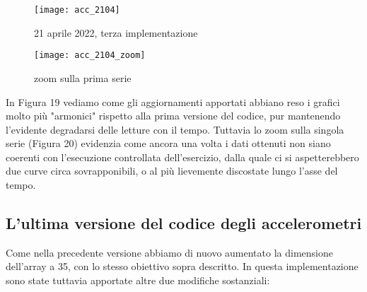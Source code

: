 \documentclass[fleqn,10pt]{SelfArx} %
\begin{document}
\begin{figure}[htb]\centering
	\texttt{[image: acc\_2104]}
	\caption{21 aprile 2022, terza implementazione}
	\label{fig:accelerazione 2104}
\end{figure}

\begin{figure}[htb]\centering
	\texttt{[image: acc\_2104\_zoom]}
	\caption{zoom sulla prima serie}
	\label{fig:zoom accelerazione 2104}
\end{figure}

In Figura 19 vediamo come gli aggiornamenti apportati abbiano reso i grafici molto più "armonici" rispetto alla prima versione 
del codice, pur mantenendo l'evidente degradarsi delle letture con il tempo.
Tuttavia lo zoom sulla singola serie (Figura 20) evidenzia come ancora una volta i dati ottenuti non siano coerenti con 
l'esecuzione controllata dell'esercizio, dalla quale ci si aspetterebbero due curve circa sovrapponibili, o al più lievemente 
discostate lungo l'asse del tempo.

\subsection{L'ultima versione del codice degli accelerometri}

Come nella precedente versione abbiamo di nuovo aumentato la dimensione dell'array a 35, con lo stesso obiettivo 
sopra descritto. In questa implementazione sono state tuttavia apportate altre due modifiche sostanziali:
\end{document}
